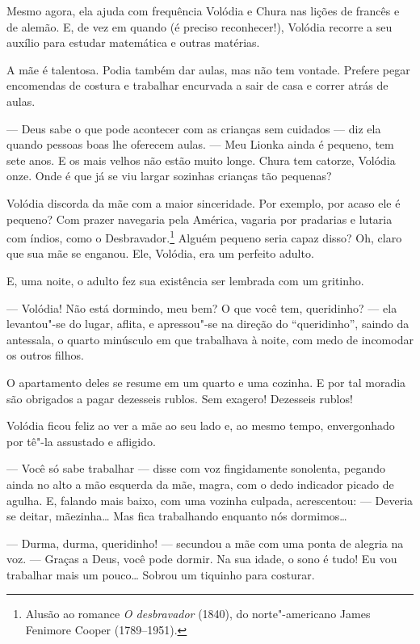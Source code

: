 Mesmo agora, ela ajuda com frequência Volódia e Chura nas lições de
francês e de alemão. E, de vez em quando (é preciso reconhecer!),
Volódia recorre a seu auxílio para estudar matemática e outras matérias.

A mãe é talentosa. Podia também dar aulas, mas não tem vontade. Prefere
pegar encomendas de costura e trabalhar encurvada a sair de casa e
correr atrás de aulas.

--- Deus sabe o que pode acontecer com as crianças sem cuidados --- diz
ela quando pessoas boas lhe oferecem aulas. --- Meu Lionka ainda é
pequeno, tem sete anos. E os mais velhos não estão muito longe. Chura
tem catorze, Volódia onze. Onde é que já se viu largar sozinhas crianças
tão pequenas?

Volódia discorda da mãe com a maior sinceridade. Por exemplo, por acaso
ele é pequeno? Com prazer navegaria pela América, vagaria por pradarias
e lutaria com índios, como o Desbravador.\footnote{Alusão ao romance
  \emph{O desbravador} (1840), do norte"-americano James Fenimore Cooper
  (1789--1951).} Alguém pequeno seria capaz disso? Oh, claro que sua mãe
se enganou. Ele, Volódia, era um perfeito adulto.

E, uma noite, o adulto fez sua existência ser lembrada com um gritinho.

--- Volódia! Não está dormindo, meu bem? O que você tem, queridinho? ---
ela levantou"-se do lugar, aflita, e apressou"-se na direção do
``queridinho'', saindo da antessala, o quarto minúsculo em que
trabalhava à noite, com medo de incomodar os outros filhos.

O apartamento deles se resume em um quarto e uma cozinha. E por tal
moradia são obrigados a pagar dezesseis rublos. Sem exagero! Dezesseis
rublos!

Volódia ficou feliz ao ver a mãe ao seu lado e, ao mesmo tempo,
envergonhado por tê"-la assustado e afligido.

--- Você só sabe trabalhar --- disse com voz fingidamente sonolenta,
pegando ainda no alto a mão esquerda da mãe, magra, com o dedo indicador
picado de agulha. E, falando mais baixo, com uma vozinha culpada,
acrescentou: --- Deveria se deitar, mãezinha\ldots{} Mas fica trabalhando
enquanto nós dormimos\ldots{}

--- Durma, durma, queridinho! --- secundou a mãe com uma ponta de
alegria na voz. --- Graças a Deus, você pode dormir. Na sua idade, o
sono é tudo! Eu vou trabalhar mais um pouco\ldots{} Sobrou um
tiquinho para costurar.

